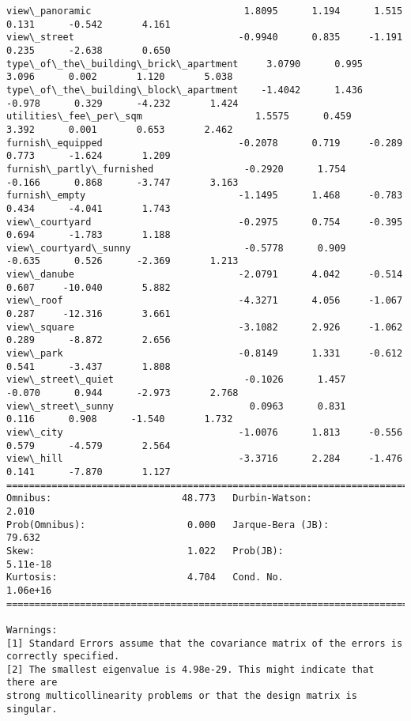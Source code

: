 \documentclass[11pt]{article}
\begin{document}
\begin{Verbatim}[commandchars=\\\{\}]
view\_panoramic                           1.8095      1.194      1.515      0.131      -0.542       4.161
view\_street                             -0.9940      0.835     -1.191      0.235      -2.638       0.650
type\_of\_the\_building\_brick\_apartment     3.0790      0.995      3.096      0.002       1.120       5.038
type\_of\_the\_building\_block\_apartment    -1.4042      1.436     -0.978      0.329      -4.232       1.424
utilities\_fee\_per\_sqm                    1.5575      0.459      3.392      0.001       0.653       2.462
furnish\_equipped                        -0.2078      0.719     -0.289      0.773      -1.624       1.209
furnish\_partly\_furnished                -0.2920      1.754     -0.166      0.868      -3.747       3.163
furnish\_empty                           -1.1495      1.468     -0.783      0.434      -4.041       1.743
view\_courtyard                          -0.2975      0.754     -0.395      0.694      -1.783       1.188
view\_courtyard\_sunny                    -0.5778      0.909     -0.635      0.526      -2.369       1.213
view\_danube                             -2.0791      4.042     -0.514      0.607     -10.040       5.882
view\_roof                               -4.3271      4.056     -1.067      0.287     -12.316       3.661
view\_square                             -3.1082      2.926     -1.062      0.289      -8.872       2.656
view\_park                               -0.8149      1.331     -0.612      0.541      -3.437       1.808
view\_street\_quiet                       -0.1026      1.457     -0.070      0.944      -2.973       2.768
view\_street\_sunny                        0.0963      0.831      0.116      0.908      -1.540       1.732
view\_city                               -1.0076      1.813     -0.556      0.579      -4.579       2.564
view\_hill                               -3.3716      2.284     -1.476      0.141      -7.870       1.127
==============================================================================
Omnibus:                       48.773   Durbin-Watson:                   2.010
Prob(Omnibus):                  0.000   Jarque-Bera (JB):               79.632
Skew:                           1.022   Prob(JB):                     5.11e-18
Kurtosis:                       4.704   Cond. No.                     1.06e+16
==============================================================================

Warnings:
[1] Standard Errors assume that the covariance matrix of the errors is correctly specified.
[2] The smallest eigenvalue is 4.98e-29. This might indicate that there are
strong multicollinearity problems or that the design matrix is singular.

    \end{Verbatim}
\end{document}
